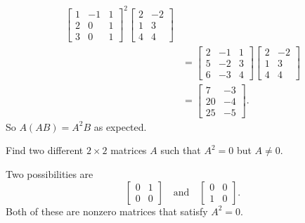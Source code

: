 \begin{solution}
\begin{align*}
\begin{bmatrix}
      1 & -1 & 1 \\
      2 & 0 & 1 \\
      3 & 0 & 1
    \end{bmatrix}^2
    \begin{bmatrix}
      2 & -2 \\
      1 & 3 \\
      4 & 4
    \end{bmatrix} \\
    &=
    \begin{bmatrix}
      2 & -1 & 1 \\
      5 & -2 & 3 \\
      6 & -3 & 4
    \end{bmatrix}
    \begin{bmatrix}
      2 & -2 \\
      1 & 3 \\
      4 & 4
    \end{bmatrix} \\
    &=
    \begin{bmatrix}
      7 & -3 \\
      20 & -4 \\
      25 & -5
    \end{bmatrix}.
  \end{align*}
  So $A(AB) = A^2B$ as expected.
\end{solution}

 Find two different $2\times2$ matrices $A$ such that
$A^2 = 0$ but $A\neq0$.
\begin{solution}
  Two possibilities are
  \begin{equation*}
    \begin{bmatrix}
      0 & 1 \\
      0 & 0
    \end{bmatrix}
    \quad\text{and}\quad
    \begin{bmatrix}
      0 & 0 \\
      1 & 0
    \end{bmatrix}.
  \end{equation*}
  Both of these are nonzero matrices that satisfy $A^2 = 0$.
\end{solution}

